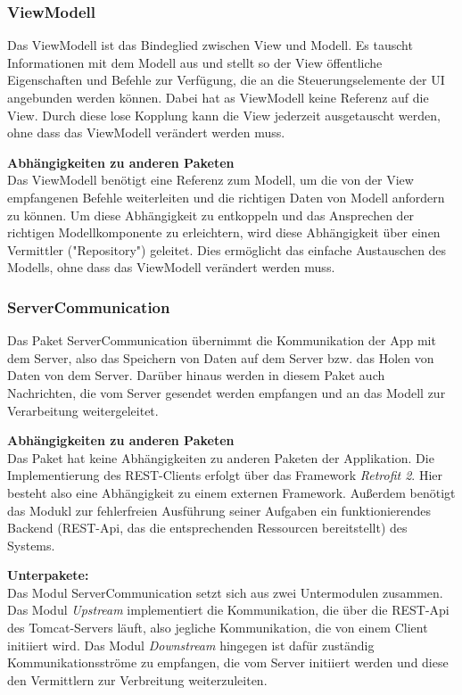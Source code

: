 \subsubsection{ViewModell}
Das ViewModell ist das Bindeglied zwischen View und Modell. Es tauscht Informationen mit dem Modell aus und stellt so der View öffentliche Eigenschaften und Befehle zur Verfügung, die an die Steuerungselemente der UI angebunden werden können. Dabei hat as ViewModell keine Referenz auf die View. Durch diese lose Kopplung kann die View jederzeit ausgetauscht werden, ohne dass das ViewModell verändert werden muss.

\textbf{Abhängigkeiten zu anderen Paketen}\\
Das ViewModell benötigt eine Referenz zum Modell, um die von der View empfangenen Befehle weiterleiten und die richtigen Daten von Modell anfordern zu können. Um diese Abhängigkeit zu entkoppeln und das Ansprechen der richtigen Modellkomponente zu erleichtern, wird diese Abhängigkeit über einen Vermittler ("Repository") geleitet. Dies ermöglicht das einfache Austauschen des Modells, ohne dass das ViewModell verändert werden muss.

\subsubsection{ServerCommunication}
Das Paket ServerCommunication übernimmt die Kommunikation der App mit dem Server, also das Speichern von Daten auf dem Server bzw. das Holen von Daten von dem Server. Darüber hinaus werden in diesem Paket auch Nachrichten, die vom Server gesendet werden empfangen und an das Modell zur Verarbeitung weitergeleitet.

\textbf{Abhängigkeiten zu anderen Paketen}\\
Das Paket hat keine Abhängigkeiten zu anderen Paketen der Applikation. Die Implementierung des REST-Clients erfolgt über das Framework \textit{Retrofit 2}. Hier besteht also eine Abhängigkeit zu einem externen Framework. Außerdem benötigt das Modukl zur fehlerfreien Ausführung seiner Aufgaben ein funktionierendes Backend (REST-Api, das die entsprechenden Ressourcen bereitstellt) des Systems.

\textbf{Unterpakete:}\\
Das Modul ServerCommunication setzt sich aus zwei Untermodulen zusammen. Das Modul \textit{Upstream} implementiert die Kommunikation, die über die REST-Api des Tomcat-Servers läuft, also jegliche Kommunikation, die von einem Client initiiert wird. Das Modul \textit{Downstream} hingegen ist dafür zuständig Kommunikationsströme zu empfangen, die vom Server initiiert werden und diese den Vermittlern zur Verbreitung weiterzuleiten.

